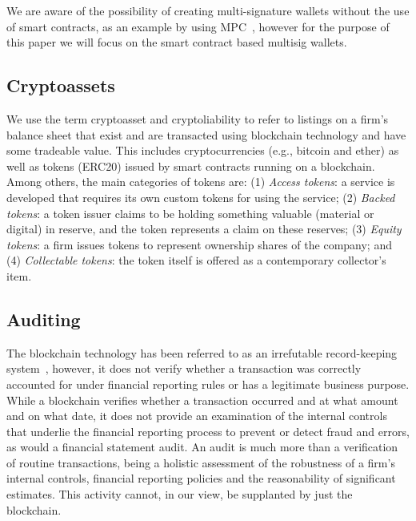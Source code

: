 We are aware of the possibility of creating multi-signature wallets without the use of smart contracts, as an example by using MPC~\cite{zhao2019secure}, however for the purpose of this paper we will focus on the smart contract based multisig wallets.

\subsection{Cryptoassets}
We use the term cryptoasset and cryptoliability to refer to listings on a firm's balance sheet that exist and are transacted using blockchain technology and have some tradeable value. This includes cryptocurrencies (e.g., bitcoin and ether) as well as tokens (\eg ERC20) issued by smart contracts running on a blockchain. Among others, the main categories of tokens are: (1) \textit{Access tokens}: a service is developed that requires its own custom tokens for using the service; (2) \textit{Backed tokens}: a token issuer claims to be holding something valuable (material or digital) in reserve, and the token represents a claim on these reserves; (3) \textit{Equity tokens}: a firm issues tokens to represent ownership shares of the company; and (4) \textit{Collectable tokens}: the token itself is offered as a contemporary collector's item. 


\subsection{Auditing}
The blockchain technology has been referred to as an irrefutable record-keeping system~\cite{crosby2016blockchain}, however, it does not verify whether a transaction was correctly accounted for under financial reporting rules or has a legitimate business purpose. While a blockchain verifies whether a transaction occurred and at what amount and on what date, it does not provide an examination of the internal controls that underlie the financial reporting process to prevent or detect fraud and errors, as would a financial statement audit. An audit is much more than a verification of routine transactions, being a holistic assessment of the robustness of a firm's internal controls, financial reporting policies and the reasonability of significant estimates. This activity cannot, in our view, be supplanted by just the blockchain.

